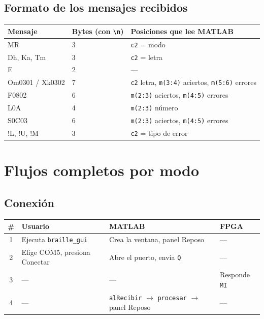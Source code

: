 \documentclass[11pt,a4paper]{article}
\newcommand{\cod}[1]{\texttt{#1}}
\begin{document}
\subsection{Formato de los mensajes recibidos}
\begin{center}
\begin{tabular}{>{\ttfamily}l l >{\raggedright\arraybackslash}p{7.2cm}}
\toprule
\normalfont\textbf{Mensaje} & \textbf{Bytes (con \cod{\textbackslash n})} & \textbf{Posiciones que lee MATLAB} \\
\midrule
MR & 3 & \cod{c2} = modo \\
Dh, Ka, Tm & 3 & \cod{c2} = letra \\
E & 2 & --- \\
Om0301 / Xk0302 & 7 & \cod{c2} letra, \cod{m(3:4)} aciertos, \cod{m(5:6)} errores \\
F0802 & 6 & \cod{m(2:3)} aciertos, \cod{m(4:5)} errores \\
L0A & 4 & \cod{m(2:3)} número \\
S0C03 & 6 & \cod{m(2:3)} aciertos, \cod{m(4:5)} errores \\
!L, !U, !M & 3 & \cod{c2} = tipo de error \\
\bottomrule
\end{tabular}
\end{center}

\section{Flujos completos por modo}

\subsection{Conexión}
\begin{longtable}{c p{4.2cm} p{4.6cm} p{4.4cm}}
\toprule
\textbf{\#} & \textbf{Usuario} & \textbf{MATLAB} & \textbf{FPGA} \\
\midrule
\endhead
1 & Ejecuta \cod{braille\_gui} & Crea la ventana, panel Reposo & --- \\
2 & Elige COM5, presiona Conectar & Abre el puerto, envía \cod{Q} & --- \\
3 & --- & --- & Responde \cod{MI} \\
4 & --- & \cod{alRecibir} $\rightarrow$ \cod{procesar} $\rightarrow$ panel Reposo & --- \\
\bottomrule
\end{longtable}
\end{document}
